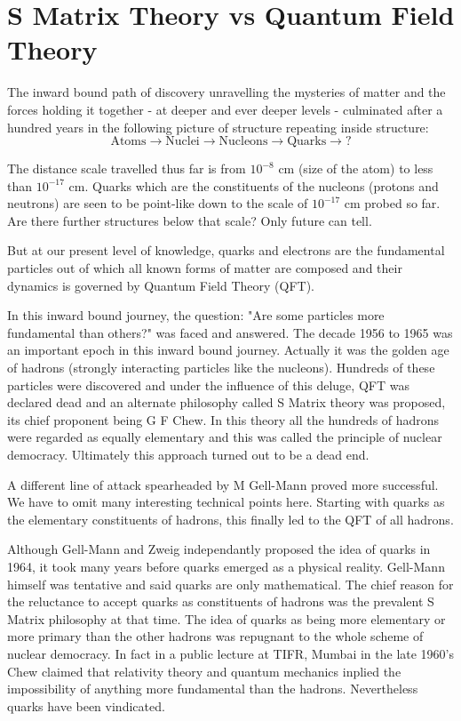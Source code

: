 \section{S Matrix Theory vs Quantum Field Theory}

The inward bound path of discovery unravelling the mysteries of
matter and the forces holding it together - at deeper and ever
deeper levels - culminated after a hundred years
in the following picture of structure repeating inside structure:
$$
\text{Atoms} \rightarrow \text{Nuclei} \rightarrow \text{Nucleons} \rightarrow \text{Quarks} \rightarrow ?
$$

The distance scale travelled thus far is from $10^{-8}$ cm (size of the
atom) to less than $10^{-17}$ cm. Quarks which are the constituents
of the nucleons (protons and neutrons) are seen to be point-like 
down to the scale of $10^{-17}$ cm probed so far. Are there
further structures below that scale? Only future can tell.

But at our present level of knowledge, quarks and electrons are
the fundamental particles out of which all known forms of matter
are composed and their dynamics is governed by Quantum Field 
Theory (QFT).

In this inward bound journey, the question: "Are some particles
more fundamental than others?" was faced and answered.
The decade 1956 to 1965 was an important epoch in this inward
bound journey. Actually it was the golden age of hadrons (strongly
interacting particles like the nucleons). Hundreds of these
particles were discovered and under the influence of this deluge,
QFT was declared dead and an alternate philosophy called
S Matrix theory was proposed, its chief proponent being 
G F Chew. In this theory all the hundreds of hadrons were
regarded as equally elementary and this was called the
principle of nuclear democracy. Ultimately this approach turned out
to be a dead end.  

A different line of attack spearheaded by M Gell-Mann proved more
successful. We have to omit many interesting technical points here.
Starting with quarks as the elementary constituents of hadrons, this 
finally led to the QFT of all hadrons. 
 
Although Gell-Mann and Zweig independantly
proposed the idea of quarks in 1964, it took many years before
quarks emerged as a physical reality. Gell-Mann himself was
tentative and said quarks are only mathematical. The chief reason
for the reluctance to accept quarks as constituents of hadrons
was the prevalent S Matrix philosophy at that time. The idea of
quarks as being more elementary or more primary than the other 
hadrons was repugnant to the whole scheme of nuclear democracy.
In fact in a public lecture at TIFR, Mumbai in the late 1960's
Chew claimed that relativity theory and quantum mechanics inplied
the impossibility of anything more fundamental than the hadrons.
Nevertheless quarks have been vindicated.

